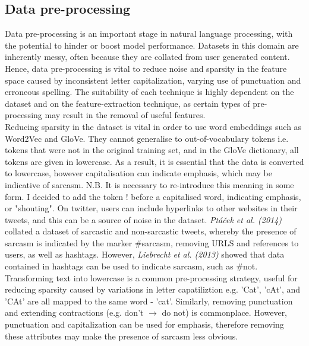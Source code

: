 \documentclass[12pt,a4paper]{article}
\begin{document}
\subsection{Data pre-processing}
\noindent Data pre-processing is an important stage in natural language processing, with the potential to hinder or boost model performance. Datasets in this domain are inherently messy, often because they are collated from user generated content. Hence, data pre-processing is vital to reduce noise and sparsity in the feature space caused by inconsistent letter capitalization, varying use of punctuation and erroneous spelling. The suitability of each technique is highly dependent on the dataset and on the feature-extraction technique, as certain types of pre-processing may result in the removal of useful features. \\

Reducing sparsity in the dataset is vital in order to use word embeddings such as Word2Vec and GloVe. They cannot generalise to out-of-vocabulary tokens i.e. tokens that were not in the original training set, and in the GloVe dictionary, all tokens are given in lowercase. As a result, it is essential that the data is converted to lowercase, however capitalisation can indicate emphasis, which may be indicative of sarcasm. N.B. It is necessary to re-introduce this meaning in some form. I decided to add the token ! before a capitalised word, indicating emphasis, or "shouting". On twitter, users can include hyperlinks to other websites in their tweets, and this can be a source of noise in the dataset. \textit{Pt{\'a}{\v{c}ek et al. (2014)}} \cite{ptavcek2014sarcasm} collated a dataset of sarcastic and non-sarcastic tweets, whereby the presence of sarcasm is indicated by the marker \#sarcasm, removing URLS and references to users, as well as hashtags. However, \textit{Liebrecht et al. (2013)} \cite{liebrecht2013perfect} showed that data contained in hashtags can be used to indicate sarcasm, such as \#not. Transforming text into lowercase is a common pre-processing strategy, useful for reducing sparsity caused by variations in letter capatiliztion e.g. 'Cat', 'cAt', and 'CAt' are all mapped to the same word - 'cat'. Similarly, removing punctuation and extending contractions (e.g. don't $\rightarrow$ do not) is commonplace. However, punctuation and capitalization can be used for emphasis, therefore removing these attributes may make the presence of sarcasm less obvious.

\end{document}
